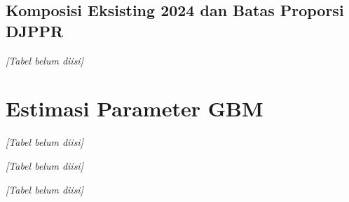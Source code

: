         \subsection{Komposisi Eksisting 2024 dan Batas Proporsi DJPPR}\label{subsec:existing composition}

        \begin{table}[H]
            \centering
            \caption{Komposisi eksisting 2024 ($w_0$) dan batas proporsi DJPPR}\label{tab:existing composition}
            \textit{[Tabel belum diisi]}
        \end{table}

    \section{Estimasi Parameter GBM}\label{sec:gbm}

        \begin{table}[H]
            \centering
            \caption{Parameter GBM tahunan sembilan variabel pasar}\label{tab:gbm params}
            \textit{[Tabel belum diisi]}
        \end{table}

        \begin{table}[H]
            \centering
            \caption{Matriks korelasi log-return variabel pasar}\label{tab:correlation}
            \textit{[Tabel belum diisi]}
        \end{table}

        \begin{table}[H]
            \centering
            \caption{Statistik perubahan biaya historis definisi bruto dan bunga}\label{tab:cost change stats}
            \textit{[Tabel belum diisi]}
        \end{table}

